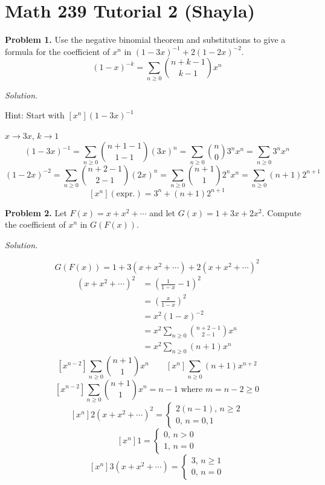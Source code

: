 \section{Math 239 Tutorial 2 (Shayla)}

\textbf{Problem 1.}
Use the negative binomial theorem and substitutions to give a formula for the
coefficient of $ x^n $ in $ (1-3x)^{-1} + 2(1-2x)^{-2} $.
\[ (1-x)^{-k}=\sum\limits_{n\ge 0}\binom{n+k-1}{k-1}x^n \]

\emph{Solution.}

Hint: Start with $ [x^n](1-3x)^{-1} $

$ x\rightarrow 3x $, $ k\rightarrow1 $
\[ (1-3x)^{-1}=\sum\limits_{n\ge 0}\binom{n+1-1}{1-1}(3x)^n
=\sum\limits_{n\ge 0}\binom{n}{0}3^n x^n=\sum\limits_{n\ge 0}3^n x^n  \]
\[ (1-2x)^{-2}=\sum\limits_{n\ge 0}\binom{n+2-1}{2-1}(2x)^n
=\sum\limits_{n\ge 0}\binom{n+1}{1}2^n x^n=\sum\limits_{n\ge 0}(n+1)2^{n+1} \]
\[ [x^n](\text{expr.})=3^n+(n+1)2^{n+1} \]


\textbf{Problem 2.}
Let $ F(x)=x+x^2+\cdots $ and let $ G(x)=1+3x+2x^2 $. Compute the coefficient
of $ x^n $ in $ G(F(x)) $.

\emph{Solution.}

\[ G(F(x))=1+3(x+x^2+\cdots)+2(x+x^2+\cdots)^2 \]
\begin{align*}
    (x+x^2+\cdots)^2&=
    \left( \frac{1}{1-x} -1 \right)^2\\
    &=\left( \frac{x}{1-x}  \right)^2\\
    &=x^2(1-x)^{-2}\\
    &=x^2 \sum\limits_{n\ge 0}\binom{n+2-1}{2-1}x^n\\
    &=x^2 \sum\limits_{n\ge 0}(n+1)x^n 
\end{align*}
\[ [x^{n-2}]\sum\limits_{n\ge 0}\binom{n+1}{1}x^n\qquad
[x^n]\sum\limits_{n\ge 0}(n+1)x^{n+2} \]
\[
    [x^{n-2}]\sum\limits_{n\ge 0}\binom{n+1}{1}x^n=n-1\text{ where }
    m=n-2\ge 0 \]
\[ [x^n]2(x+x^2+\cdots)^2=
\begin{cases}
    2(n-1),\,n\ge 2\\
    0,\,n=0,1
\end{cases} \]
\[ [x^n]1=
\begin{cases}
    0,\,n>0\\
    1,\,n=0
\end{cases} \]
\[ [x^n]3(x+x^2+\cdots)=
\begin{cases}
    3,\,n\ge 1\\
    0,\,n=0
\end{cases} \]

